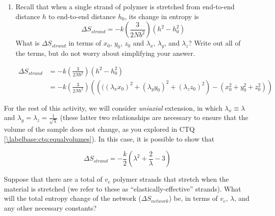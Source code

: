 \begin{activity}
\begin{ctqs}
\begin{enumerate}
			\item Recall that when a single strand of polymer is stretched from end-to-end distance $h$ to end-to-end distance $h_0$, its change in entropy is 
			\begin{equation*}
				\Delta S_{strand} = -k\left(\frac{3}{2Nb^2}\right)(h^2 - h_0^2)
			\end{equation*}
			 What is $\Delta S_{strand}$ in terms of $x_0$, $y_0$, $z_0$ and $\lambda_x$, $\lambda_y$, and $\lambda_z$?  Write out all of the terms, but do not worry about simplifying your answer.
		
				\begin{solution}[2.25in]
					\begin{align*}
						\Delta S_{strand} &= -k\left(\frac{3}{2Nb^2}\right)(h^2 - h_0^2)\\
							&= -k\left(\frac{3}{2Nb^2}\right)\left(\left(((\lambda_x x_0)^2 + (\lambda_y y_0)^2 + (\lambda_z z_0)^2\right) - \left(x_0^2 + y_0^2 + z_0^2\right)\right)
					\end{align*}
				\end{solution}
				
		\end{enumerate}
				
\end{ctqs}

\begin{infobox}

	For the rest of this activity, we will consider \emph{uniaxial} extension, in which $\lambda_x \equiv \lambda$ and $\lambda_y = \lambda_z = \frac{1}{\sqrt{\lambda}}$ (these latter two relationships are necessary to ensure that the volume of the sample does not change, as you explored in CTQ \ref{\labelbase:ctq:equalvolumes}).  In this case, it is possible to show that
	
		\begin{equation*}	
				\Delta S_{strand} = -\frac{k}{2}\left(\lambda^2 + \frac{2}{\lambda} - 3\right)
			\label{\labelbase:eqn:delSstranduniaxial}
		\end{equation*}
			
\end{infobox}

\begin{ctqs}
		
	\question Suppose that there are a total of $v_e$ polymer strands that stretch when the material is stretched (we refer to these as ``elastically-effective'' strands). What will the total entropy change of the network ($\Delta S_{network}$) be, in terms of $v_e$, $\lambda$, and any other necessary constants?
		

\end{ctqs}
\end{activity}
